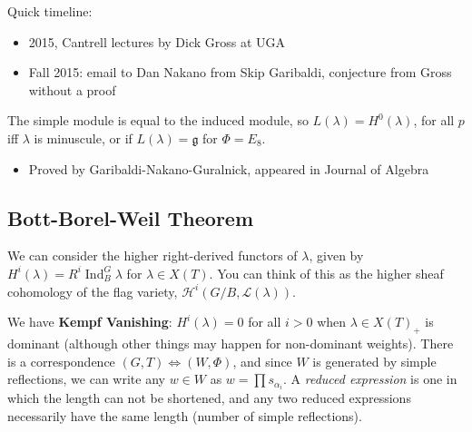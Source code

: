 \begin{remark}

\begin{remark}

Quick timeline:

\begin{itemize}
\tightlist
\item
  2015, Cantrell lectures by Dick Gross at UGA
\item
  Fall 2015: email to Dan Nakano from Skip Garibaldi, conjecture from
  Gross without a proof
\end{itemize}

\begin{proposition}[Gross]

\begin{proposition}[Gross]

The simple module is equal to the induced module, so
\(L(\lambda) = H^0(\lambda)\), for all \(p\) iff \(\lambda\) is
minuscule, or if \(L(\lambda) = {\mathfrak{g}}\) for \(\Phi = E_8\).

\end{proposition}

\end{proposition}

\begin{itemize}
\tightlist
\item
  Proved by Garibaldi-Nakano-Guralnick, appeared in Journal of Algebra
\end{itemize}

\end{remark}

\end{remark}

\hypertarget{bott-borel-weil-theorem}{%
\subsection{Bott-Borel-Weil Theorem}\label{bott-borel-weil-theorem}}

We can consider the higher right-derived functors of \(\lambda\), given
by \(H^i(\lambda) = R^i \operatorname{Ind}_B^G \lambda\) for
\(\lambda \in X(T)\). You can think of this as the higher sheaf
cohomology of the flag variety,
\(\mathcal{H}^i(G/B, \mathcal{L}(\lambda))\).

We have \textbf{Kempf Vanishing}: \(H^i(\lambda) = 0\) for all \(i>0\)
when \(\lambda \in X(T)_+\) is dominant (although other things may
happen for non-dominant weights). There is a correspondence
\((G, T) \iff (W, \Phi)\), and since \(W\) is generated by simple
reflections, we can write any \(w\in W\) as \(w=\prod s_{\alpha_i}\). A
\emph{reduced expression} is one in which the length can not be
shortened, and any two reduced expressions necessarily have the same
length (number of simple reflections).


